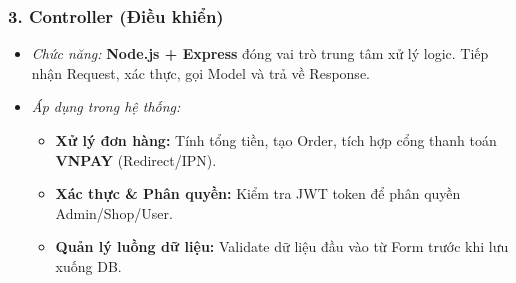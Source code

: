 \subsubsection*{3. Controller (Điều khiển)}
\begin{itemize}
    \item \textit{Chức năng:} \textbf{Node.js + Express} đóng vai trò trung tâm xử lý logic. Tiếp nhận Request, xác thực, gọi Model và trả về Response.
    \item \textit{Áp dụng trong hệ thống:}
        \begin{itemize}
            \item \textbf{Xử lý đơn hàng:} Tính tổng tiền, tạo Order, tích hợp cổng thanh toán \textbf{VNPAY} (Redirect/IPN).
            \item \textbf{Xác thực \& Phân quyền:} Kiểm tra JWT token để phân quyền Admin/Shop/User.
            \item \textbf{Quản lý luồng dữ liệu:} Validate dữ liệu đầu vào từ Form trước khi lưu xuống DB.
        \end{itemize}
\end{itemize}